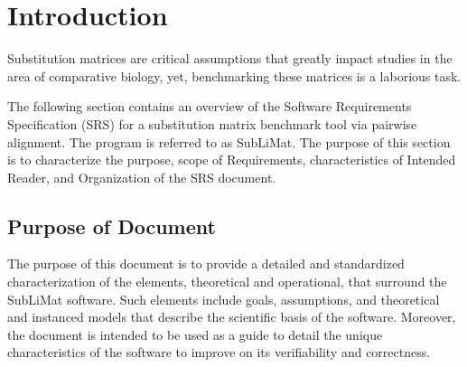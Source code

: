 \documentclass[12pt]{article}
\begin{document}


\section{Introduction}

Substitution matrices are critical assumptions that greatly impact studies
in the area of comparative biology, yet, benchmarking these matrices is a 
laborious task.

The following section contains an overview of the Software Requirements Specification (SRS)
for a substitution matrix benchmark tool via pairwise alignment. The program is referred to 
as SubLiMat. The purpose of this section is to characterize the purpose, scope of Requirements, 
characteristics of Intended Reader, and Organization of the SRS document.


\subsection{Purpose of Document}

The purpose of this document is to provide a detailed and standardized characterization of 
the elements, theoretical and operational, that surround the SubLiMat software. Such 
elements include goals, assumptions, and theoretical and instanced models that describe 
the scientific basis of the software. Moreover, the document is intended to be used as a guide to detail 
the unique characteristics of the software to improve on its verifiability and correctness. 

\end{document}
